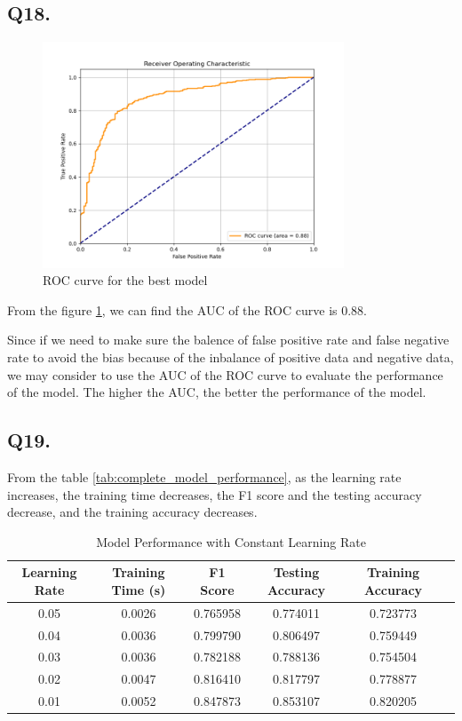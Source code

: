 \documentclass{article}
\begin{document}


\subsection*{Q18.}

\begin{figure}[h!]
    \centering
    \includegraphics[width=0.8\textwidth]{./pic/ROC_curve_set7.png}
    \caption{ROC curve for the best model}
    \label{fig:ROC}
\end{figure}

From the figure \ref{fig:ROC}, we can find the AUC of the ROC curve is 0.88. 

Since if we need to make sure the balence of false positive rate and false negative rate to avoid the bias because of the inbalance of positive data and negative data, we may consider to use the AUC of the ROC curve to evaluate the performance of the model. The higher the AUC, the better the performance of the model.


    
\subsection*{Q19.}

From the table \ref{tab:complete_model_performance}, as the learning rate increases, the training time decreases, the F1 score and the testing accuracy decrease, and the training accuracy decreases.

\begin{table}[htbp]
    \centering
    \begin{tabular}{cccccc}
    \toprule
    Learning Rate & Training Time (s) & F1 Score & Testing Accuracy & Training Accuracy \\
    \midrule
    0.05 & 0.0026 & 0.765958 & 0.774011 & 0.723773 \\
    0.04 & 0.0036 & 0.799790 & 0.806497 & 0.759449 \\
    0.03 & 0.0036 & 0.782188 & 0.788136 & 0.754504 \\
    0.02 & 0.0047 & 0.816410 & 0.817797 & 0.778877 \\
    0.01 & 0.0052 & 0.847873 & 0.853107 & 0.820205 \\
    \bottomrule
    \end{tabular}
    \caption{Model Performance with Constant Learning Rate}
    \label{tab:model_performance_constant_lr}
\end{table}
\end{document}
